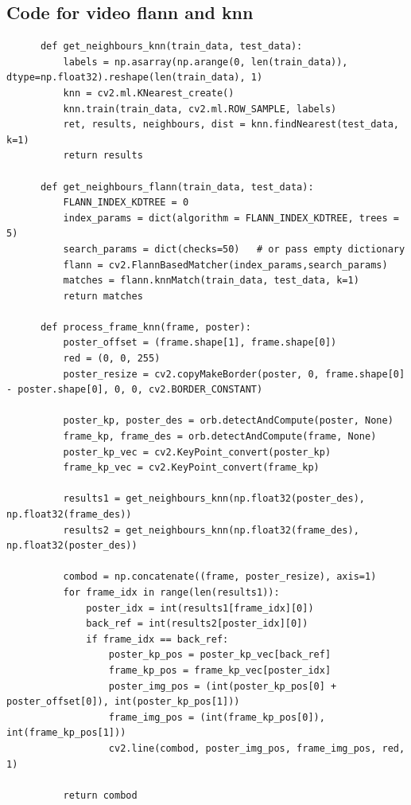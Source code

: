 \documentclass{article}
\begin{document}
  \subsection{Code for video flann and knn}
  \begin{verbatim}
      def get_neighbours_knn(train_data, test_data):
          labels = np.asarray(np.arange(0, len(train_data)), dtype=np.float32).reshape(len(train_data), 1)
          knn = cv2.ml.KNearest_create()
          knn.train(train_data, cv2.ml.ROW_SAMPLE, labels)
          ret, results, neighbours, dist = knn.findNearest(test_data, k=1)
          return results

      def get_neighbours_flann(train_data, test_data):
          FLANN_INDEX_KDTREE = 0
          index_params = dict(algorithm = FLANN_INDEX_KDTREE, trees = 5)
          search_params = dict(checks=50)   # or pass empty dictionary
          flann = cv2.FlannBasedMatcher(index_params,search_params)
          matches = flann.knnMatch(train_data, test_data, k=1)
          return matches

      def process_frame_knn(frame, poster):
          poster_offset = (frame.shape[1], frame.shape[0])
          red = (0, 0, 255)
          poster_resize = cv2.copyMakeBorder(poster, 0, frame.shape[0] - poster.shape[0], 0, 0, cv2.BORDER_CONSTANT)

          poster_kp, poster_des = orb.detectAndCompute(poster, None)
          frame_kp, frame_des = orb.detectAndCompute(frame, None)
          poster_kp_vec = cv2.KeyPoint_convert(poster_kp)
          frame_kp_vec = cv2.KeyPoint_convert(frame_kp)

          results1 = get_neighbours_knn(np.float32(poster_des), np.float32(frame_des))
          results2 = get_neighbours_knn(np.float32(frame_des), np.float32(poster_des))

          combod = np.concatenate((frame, poster_resize), axis=1)
          for frame_idx in range(len(results1)):
              poster_idx = int(results1[frame_idx][0])
              back_ref = int(results2[poster_idx][0])
              if frame_idx == back_ref:
                  poster_kp_pos = poster_kp_vec[back_ref]
                  frame_kp_pos = frame_kp_vec[poster_idx]
                  poster_img_pos = (int(poster_kp_pos[0] + poster_offset[0]), int(poster_kp_pos[1]))
                  frame_img_pos = (int(frame_kp_pos[0]), int(frame_kp_pos[1]))
                  cv2.line(combod, poster_img_pos, frame_img_pos, red, 1)

          return combod



\end{verbatim}
\end{document}
